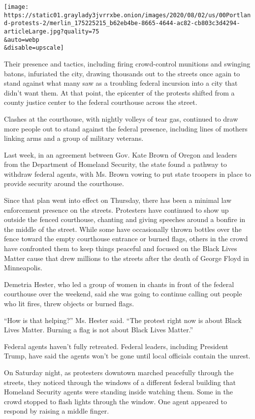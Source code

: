 \texttt{[image: https://static01.graylady3jvrrxbe.onion/images/2020/08/02/us/00Portland-protests-2/merlin\_175225215\_b62eb4be-8665-4644-ac82-cb803c3d4294-articleLarge.jpg?quality=75\\\&auto=webp\\\&disable=upscale]}

Their presence and tactics, including firing crowd-control munitions and
swinging batons, infuriated the city, drawing thousands out to the
streets once again to stand against what many saw as a troubling federal
incursion into a city that didn't want them. At that point, the
epicenter of the protests shifted from a county justice center to the
federal courthouse across the street.

Clashes at the courthouse, with nightly volleys of tear gas, continued
to draw more people out to stand against the federal presence, including
lines of mothers linking arms and a group of military veterans.

Last week, in an agreement between Gov. Kate Brown of Oregon and leaders
from the Department of Homeland Security, the state found a pathway to
withdraw federal agents, with Ms. Brown vowing to put state troopers in
place to provide security around the courthouse.

Since that plan went into effect on Thursday, there has been a minimal
law enforcement presence on the streets. Protesters have continued to
show up outside the fenced courthouse, chanting and giving speeches
around a bonfire in the middle of the street. While some have
occasionally thrown bottles over the fence toward the empty courthouse
entrance or burned flags, others in the crowd have confronted them to
keep things peaceful and focused on the Black Lives Matter cause that
drew millions to the streets after the death of George Floyd in
Minneapolis.

Demetria Hester, who led a group of women in chants in front of the
federal courthouse over the weekend, said she was going to continue
calling out people who lit fires, threw objects or burned flags.

``How is that helping?'' Ms. Hester said. ``The protest right now is
about Black Lives Matter. Burning a flag is not about Black Lives
Matter.''

Federal agents haven't fully retreated. Federal leaders, including
President Trump, have said the agents won't be gone until local
officials contain the unrest.

On Saturday night, as protesters downtown marched peacefully through the
streets, they noticed through the windows of a different federal
building that Homeland Security agents were standing inside watching
them. Some in the crowd stopped to flash lights through the window. One
agent appeared to respond by raising a middle finger.

